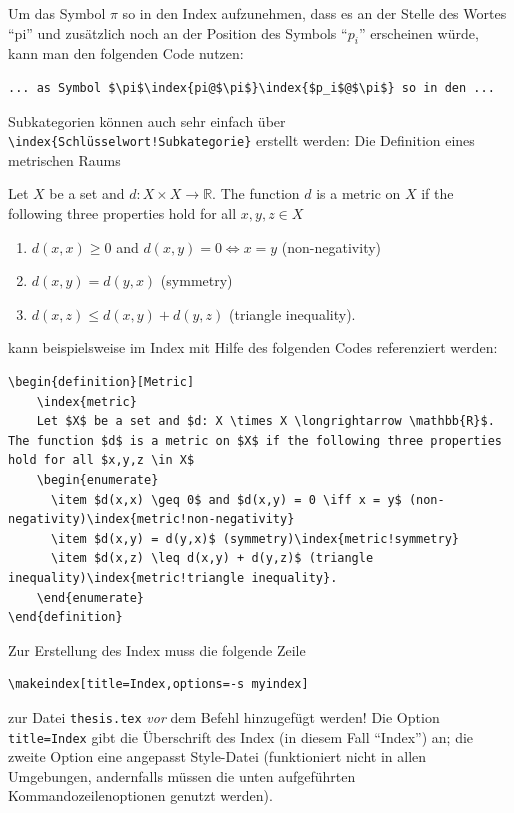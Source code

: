 Um das Symbol $\pi$ so in den Index aufzunehmen, dass es an der Stelle des Wortes \enquote{pi} und zusätzlich noch an der Position des Symbols \enquote{$p_i$} erscheinen würde, kann man den folgenden Code nutzen:
\begin{lstlisting}[language={[LaTeX]TeX}]
  ... as Symbol $\pi$\index{pi@$\pi$}\index{$p_i$@$\pi$} so in den ...
\end{lstlisting}

Subkategorien können auch sehr einfach über \verb|\index{Schlüsselwort!Subkategorie}| erstellt werden: Die Definition eines metrischen Raums 
\begin{definition}[Metric]
	Let $X$ be a set and $d: X \times X \longrightarrow \mathbb{R}$. The function $d$ is a metric on $X$ if the following three properties hold for all $x,y,z \in X$
	\begin{enumerate}
	  \item $d(x,x) \geq 0$ and $d(x,y) = 0 \iff x = y$ (non-negativity)
	  \item $d(x,y) = d(y,x)$ (symmetry)
	  \item $d(x,z) \leq d(x,y) + d(y,z)$ (triangle inequality).
	\end{enumerate}
\end{definition}
kann beispielsweise im Index mit Hilfe des folgenden Codes referenziert werden:
\begin{lstlisting}[language={[LaTeX]TeX}]
\begin{definition}[Metric]
	\index{metric}
	Let $X$ be a set and $d: X \times X \longrightarrow \mathbb{R}$. The function $d$ is a metric on $X$ if the following three properties hold for all $x,y,z \in X$
	\begin{enumerate}
	  \item $d(x,x) \geq 0$ and $d(x,y) = 0 \iff x = y$ (non-negativity)\index{metric!non-negativity}
	  \item $d(x,y) = d(y,x)$ (symmetry)\index{metric!symmetry}
	  \item $d(x,z) \leq d(x,y) + d(y,z)$ (triangle inequality)\index{metric!triangle inequality}.
	\end{enumerate}
\end{definition}
\end{lstlisting}

Zur Erstellung des Index muss die folgende Zeile
\begin{lstlisting}[language={[LaTeX]TeX}]
	\makeindex[title=Index,options=-s myindex]
\end{lstlisting}
zur Datei \verb|thesis.tex| \emph{vor} dem Befehl \verb|| hinzugefügt werden! Die Option \verb|title=Index| gibt die Überschrift des Index (in diesem Fall \enquote{Index}) an; die zweite Option eine angepasst Style-Datei (funktioniert nicht in allen Umgebungen, andernfalls müssen die unten aufgeführten Kommandozeilenoptionen genutzt werden).

